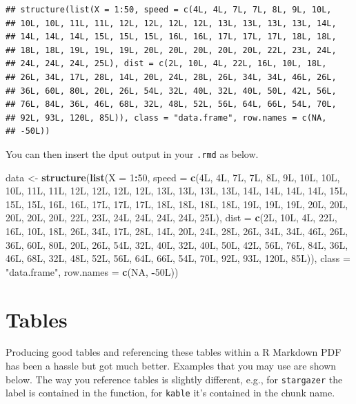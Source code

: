 \documentclass[
  12pt,
]{article}
\newenvironment{Shaded}{\begin{snugshade}}{\end{snugshade}}
\newcommand{\AttributeTok}[1]{\textcolor[rgb]{0.13,0.29,0.53}{#1}}
\newcommand{\ConstantTok}[1]{\textcolor[rgb]{0.56,0.35,0.01}{#1}}
\newcommand{\DecValTok}[1]{\textcolor[rgb]{0.00,0.00,0.81}{#1}}
\newcommand{\FunctionTok}[1]{\textcolor[rgb]{0.13,0.29,0.53}{\textbf{#1}}}
\newcommand{\NormalTok}[1]{#1}
\newcommand{\OtherTok}[1]{\textcolor[rgb]{0.56,0.35,0.01}{#1}}
\newcommand{\SpecialCharTok}[1]{\textcolor[rgb]{0.81,0.36,0.00}{\textbf{#1}}}
\newcommand{\StringTok}[1]{\textcolor[rgb]{0.31,0.60,0.02}{#1}}
\begin{document}
\begin{verbatim}
## structure(list(X = 1:50, speed = c(4L, 4L, 7L, 7L, 8L, 9L, 10L, 
## 10L, 10L, 11L, 11L, 12L, 12L, 12L, 12L, 13L, 13L, 13L, 13L, 14L, 
## 14L, 14L, 14L, 15L, 15L, 15L, 16L, 16L, 17L, 17L, 17L, 18L, 18L, 
## 18L, 18L, 19L, 19L, 19L, 20L, 20L, 20L, 20L, 20L, 22L, 23L, 24L, 
## 24L, 24L, 24L, 25L), dist = c(2L, 10L, 4L, 22L, 16L, 10L, 18L, 
## 26L, 34L, 17L, 28L, 14L, 20L, 24L, 28L, 26L, 34L, 34L, 46L, 26L, 
## 36L, 60L, 80L, 20L, 26L, 54L, 32L, 40L, 32L, 40L, 50L, 42L, 56L, 
## 76L, 84L, 36L, 46L, 68L, 32L, 48L, 52L, 56L, 64L, 66L, 54L, 70L, 
## 92L, 93L, 120L, 85L)), class = "data.frame", row.names = c(NA, 
## -50L))
\end{verbatim}

You can then insert the dput output in your \texttt{.rmd} as below.

\begin{Shaded}
\begin{Highlighting}[]
\NormalTok{data }\OtherTok{\textless{}{-}} \FunctionTok{structure}\NormalTok{(}\FunctionTok{list}\NormalTok{(}\AttributeTok{X =} \DecValTok{1}\SpecialCharTok{:}\DecValTok{50}\NormalTok{, }\AttributeTok{speed =} \FunctionTok{c}\NormalTok{(4L, 4L, 7L, 7L, 8L, 9L, 10L, }
\NormalTok{10L, 10L, 11L, 11L, 12L, 12L, 12L, 12L, 13L, 13L, 13L, 13L, 14L, }
\NormalTok{14L, 14L, 14L, 15L, 15L, 15L, 16L, 16L, 17L, 17L, 17L, 18L, 18L, }
\NormalTok{18L, 18L, 19L, 19L, 19L, 20L, 20L, 20L, 20L, 20L, 22L, 23L, 24L, }
\NormalTok{24L, 24L, 24L, 25L), }\AttributeTok{dist =} \FunctionTok{c}\NormalTok{(2L, 10L, 4L, 22L, 16L, 10L, 18L, }
\NormalTok{26L, 34L, 17L, 28L, 14L, 20L, 24L, 28L, 26L, 34L, 34L, 46L, 26L, }
\NormalTok{36L, 60L, 80L, 20L, 26L, 54L, 32L, 40L, 32L, 40L, 50L, 42L, 56L, }
\NormalTok{76L, 84L, 36L, 46L, 68L, 32L, 48L, 52L, 56L, 64L, 66L, 54L, 70L, }
\NormalTok{92L, 93L, 120L, 85L)), }
\AttributeTok{class =} \StringTok{"data.frame"}\NormalTok{, }\AttributeTok{row.names =} \FunctionTok{c}\NormalTok{(}\ConstantTok{NA}\NormalTok{, }
\SpecialCharTok{{-}}\NormalTok{50L))}
\end{Highlighting}
\end{Shaded}

\hypertarget{sec:tables}{%
\section{Tables}\label{sec:tables}}

Producing good tables and referencing these tables within a R Markdown
PDF has been a hassle but got much better. Examples that you may use are
shown below. The way you reference tables is slightly different, e.g.,
for \texttt{stargazer} the label is contained in the function, for
\texttt{kable} it's contained in the chunk name.
\end{document}
